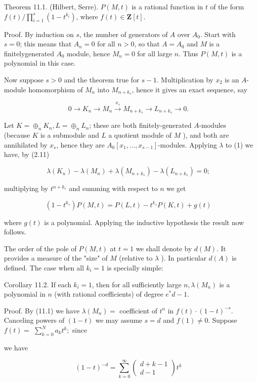 \documentclass{standalone}
\theoremstyle{definition}
\theoremstyle{remark}
\begin{document}
Theorem 11.1. (Hilbert, Serre). $P(M, t)$ is a rational function in $t$ of the form $f(t) / \prod_{i=1}^{s}\left(1-t^{k_{i}}\right)$, where $f(t) \in \mathbf{Z}[t]$.

Proof. By induction on $s$, the number of generators of $A$ over $A_{0}$. Start with $s=0$; this means that $A_{n}=0$ for all $n>0$, so that $A=A_{0}$ and $M$ is a finitelygenerated $A_{0}$ module, hence $M_{n}=0$ for all large $n$. Thus $P(M, t)$ is a polynomial in this case.

Now suppose $s>0$ and the theorem true for $s-1$. Multiplication by $x_{2}$ is an $A$-module homomorphism of $M_{n}$ into $M_{n+k_{s}}$, hence it gives an exact sequence, say

\[
0 \rightarrow K_{n} \rightarrow M_{n} \stackrel{x_{s}}{\longrightarrow} M_{n+k_{s}} \rightarrow L_{n+k_{s}} \rightarrow 0 .
\]

Let $K=\oplus_{n} K_{n}, L=\oplus_{n} L_{n}$; these are both finitely-generated $A$-modules (because $K$ is a submodule and $L$ a quotient module of $M$ ), and both are annihilated by $x_{s}$, hence they are $A_{0}\left[x_{1}, \ldots, x_{s-1}\right]$-modules. Applying $\lambda$ to (1) we have, by (2.11)

\[
\lambda\left(K_{n}\right)-\lambda\left(M_{n}\right)+\lambda\left(M_{n+k_{s}}\right)-\lambda\left(L_{n+k_{s}}\right)=0 ;
\]

multiplying by $t^{n+k_{s}}$ and summing with respect to $n$ we get

\[
\left(1-t^{k_{s}}\right) P(M, t)=P(L, t)-t^{k_{s}} P(K, t)+g(t)
\]

where $g(t)$ is a polynomial. Applying the inductive hypothesis the result now follows.

The order of the pole of $P(M, t)$ at $t=1$ we shall denote by $d(M)$. It provides a measure of the "size" of $M$ (relative to $\lambda$ ). In particular $d(A)$ is defined. The case when all $k_{i}=1$ is specially simple:

Corollary 11.2. If each $k_{i}=1$, then for all sufficiently large $n, \lambda\left(M_{n}\right)$ is a polynomial in $n$ (with rational coefficients) of degree $e^{*} d-1$.

Proof. By (11.1) we have $\lambda\left(M_{n}\right)=$ coefficient of $t^{n}$ in $f(t) \cdot(1-t)^{-s}$. Canceling powers of $(1-t)$ we may assume $s=d$ and $f(1) \neq 0$. Suppose $f(t)=$ $\sum_{k=0}^{N} a_{k} t^{k} ;$ since

we have

\[
(1-t)^{-d}=\sum_{k=0}^{\infty}\left(\begin{array}{c}
d+k-1 \\
d-1
\end{array}\right) t^{k}
\]
\end{document}
